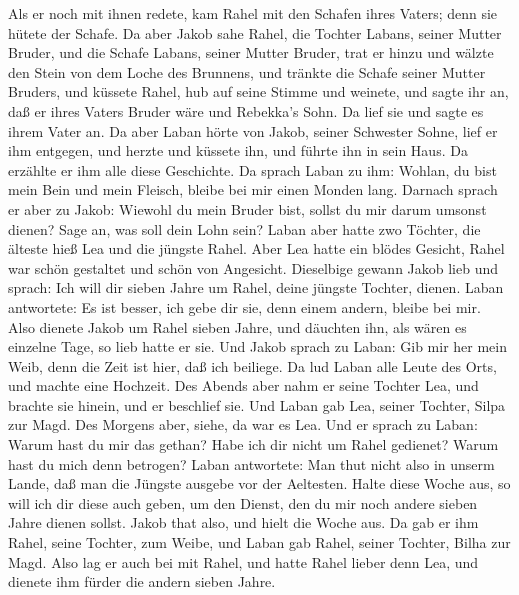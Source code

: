 Als er noch mit ihnen redete, kam Rahel mit den Schafen ihres Vaters; denn sie hütete der Schafe. Da aber Jakob sahe Rahel, die Tochter Labans, seiner Mutter Bruder, und die Schafe Labans, seiner Mutter Bruder, trat er hinzu und wälzte den Stein von dem Loche des Brunnens, und tränkte die Schafe seiner Mutter Bruders, und küssete Rahel, hub auf seine Stimme und weinete, und sagte ihr an, daß er ihres Vaters Bruder wäre und Rebekka’s Sohn. Da lief sie und sagte es ihrem Vater an. Da aber Laban hörte von Jakob, seiner Schwester Sohne, lief er ihm entgegen, und herzte und küssete ihn, und führte ihn in sein Haus. Da erzählte er ihm alle diese Geschichte. Da sprach Laban zu ihm: Wohlan, du bist mein Bein und mein Fleisch, bleibe bei mir einen Monden lang. Darnach sprach er aber zu Jakob: Wiewohl du mein Bruder bist, sollst du mir darum umsonst dienen? Sage an, was soll dein Lohn sein? Laban aber hatte zwo Töchter, die älteste hieß Lea und die jüngste Rahel. Aber Lea hatte ein blödes Gesicht, Rahel war schön gestaltet und schön von Angesicht. Dieselbige gewann Jakob lieb und sprach: Ich will dir sieben
Jahre um Rahel, deine jüngste Tochter, dienen. Laban antwortete: Es ist besser, ich gebe dir sie, denn einem andern, bleibe bei mir. Also dienete Jakob um Rahel sieben Jahre, und däuchten ihn, als wären es einzelne Tage, so lieb hatte er sie. Und Jakob sprach zu Laban: Gib mir her mein Weib, denn die Zeit ist hier, daß ich beiliege. Da lud Laban alle Leute des Orts, und machte eine Hochzeit. Des Abends aber nahm er seine Tochter Lea, und brachte sie hinein, und er beschlief sie. Und Laban gab Lea, seiner Tochter, Silpa zur Magd. Des Morgens aber, siehe, da war es Lea. Und er sprach zu Laban: Warum hast du mir das gethan? Habe ich dir nicht um Rahel gedienet? Warum hast du mich denn betrogen? Laban antwortete: Man thut nicht also in unserm Lande, daß man die Jüngste ausgebe vor der Aeltesten. Halte diese Woche aus, so will ich dir diese auch geben, um den Dienst, den du mir noch andere sieben Jahre dienen sollst. Jakob that also, und hielt die Woche aus. Da gab er ihm Rahel, seine Tochter, zum Weibe, und Laban gab Rahel, seiner Tochter, Bilha zur Magd. Also lag er auch bei mit Rahel, und hatte Rahel lieber denn Lea, und dienete ihm fürder die andern sieben Jahre.

